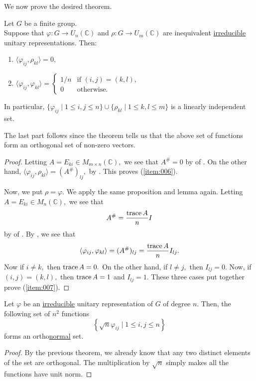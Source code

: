 We now prove the desired theorem.

\begin{thm} \label{thm:schurorthorel}
	Let $G$ be a finite group.\\
	Suppose that $\varphi : G \to U_n(\mathbb{C})$ and $\rho : G \to U_m(\mathbb{C})$ are inequivalent \underline{irreducible} unitary representations. Then:
	\begin{enumerate}
		\item \label{item:006} $\langle \varphi_{ij}, \rho_{kl}\rangle = 0,$
		\item \label{item:007} $\langle \varphi_{ij}, \varphi_{kl}\rangle = \begin{cases}
			1/n & \text{if } (i, j) = (k, l),\\
			0 & \text{otherwise}.
		\end{cases}$
	\end{enumerate}
	In particular, $\{\varphi_{ij} \mid 1 \le i, j \le n\} \cup \{\rho_{kl} \mid 1 \le k, l \le m\}$ is a linearly independent set.
\end{thm}
The last part follows since the theorem tells us that the above set of functions form an orthogonal set of non-zero vectors.
\begin{proof} 
	Letting $A = E_{ki} \in M_{m \times n}(\mathbb{C}),$ we see that $A^{\#} = 0$ by  of . On the other hand, $\langle \varphi_{ij}, \rho_{kl}\rangle = (A^{\#})_{lj},$ by . This proves (\ref{item:006}).

	Now, we put $\rho = \varphi.$ We apply the same proposition and lemma again. Letting $A = E_{ki} \in M_{n}(\mathbb{C}),$ we see that 
	\begin{equation*} 
		A^{\#} = \frac{\operatorname{trace} A}{n}I
	\end{equation*} 
	by  of . By , we see that
	\begin{equation*} 
		\langle \varphi_{ij}, \varphi_{kl}\rangle = (A^{\#})_{lj} = \frac{\operatorname{trace} A}{n}I_{lj}.
	\end{equation*}
	Now if $i \neq k,$ then $\operatorname{trace} A = 0.$ On the other hand, if $l \neq j,$ then $I_{lj} = 0.$ Now, if $(i, j) = (k, l),$ then $\operatorname{trace} A = 1$ and $I_{lj} = 1.$ These three cases put together prove (\ref{item:007}).
\end{proof}

\begin{cor} \label{cor:schurorthonormal}
	Let $\varphi$ be an \underline{irreducible} unitary representation of $G$ of degree $n.$ Then, the following set of $n^2$ functions
	\begin{equation*} 
		\left\{\sqrt{n}\varphi_{ij} \mid 1 \le i, j \le n\right\}
	\end{equation*}
	forms an ortho\underline{normal} set.
\end{cor}
\begin{proof} 
	By the previous theorem, we already know that any two distinct elements of the set are orthogonal. The multiplication by $\sqrt{n}$ simply makes all the functions have unit norm.
\end{proof}

